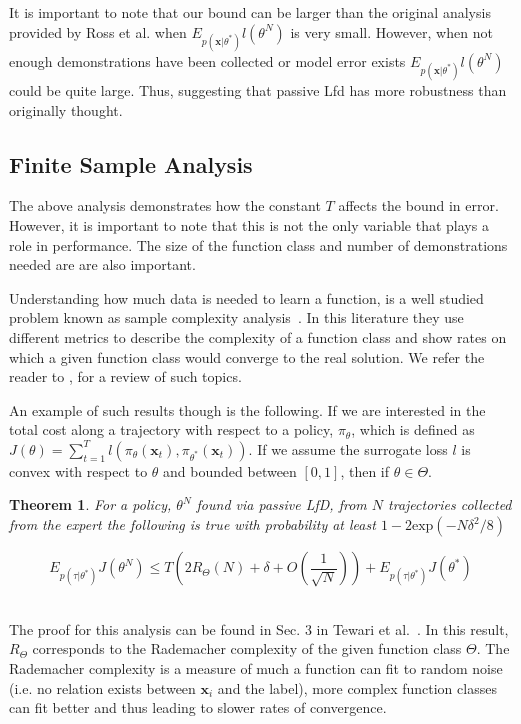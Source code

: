 \documentclass[10pt, conference]{ieeeconf}      %
\newtheorem{theorem}{Theorem}[section]
\newcommand{\bx}{\mathbf{x}}
\begin{document}
It is important to note that our bound can be larger than the original analysis provided by Ross et al. when  $E_{p(\bx|\theta^*)} l(\theta^N)$ is very small. However, when not enough demonstrations have been collected or model error exists $E_{p(\bx|\theta^*)} l(\theta^N)$ could be quite large. Thus, suggesting that passive Lfd has more robustness than originally thought. 

\subsection{Finite Sample Analysis}
The above analysis demonstrates how the constant $T$ affects the bound in error. However, it is important to note that this is not the only variable that plays a role in performance. The size of the function class and number of demonstrations needed are are also important. 

Understanding how much data is needed to learn a function, is a well studied problem known as sample complexity analysis~\cite{anthony2009neural}. In this literature they use different metrics to describe the complexity of a function class and show rates on which a given function class would converge to the real solution. We refer the reader to \cite{vapnik2013nature}, for a review of such topics. 

An example of such results though is the following.  If we are interested in the total cost along a trajectory with respect to a policy, $\pi_{\theta}$, which is defined as $J(\theta) = \sum^T_{t=1} l(\pi_{\theta}(\bx_{t}),\pi_{\theta^*}(\bx_{t}))$.  If we assume the surrogate loss $l$ is convex with respect to $\theta$ and bounded between $[0,1]$, then if $\theta \in \Theta$. \\

\begin{theorem}\label{thm:sup}
For a policy, $\theta^N$ found via passive LfD, from $N$ trajectories collected from the expert the following is true with probability at least $1- 2\mbox{exp} (-N\delta^2/8)$

$$E_{p(\tau|\theta^*)} J(\theta^N)\leq T( 2R_{\Theta}(N) + \delta+ O(\frac{1}{\sqrt{N}})) + E_{p(\tau|\theta^*)} J(\theta^*)$$\\

\end{theorem}

The proof for this analysis can be found in Sec. 3 in Tewari et al.~\cite{tewari13learning}. In this result, $R_{\Theta}$ corresponds to the Rademacher complexity of the given function class $\Theta$. The Rademacher complexity is a measure of much a function can fit to random noise (i.e. no relation exists between $\bx_i$ and the label), more complex function classes can fit better and thus leading to slower rates of convergence.
\end{document}
